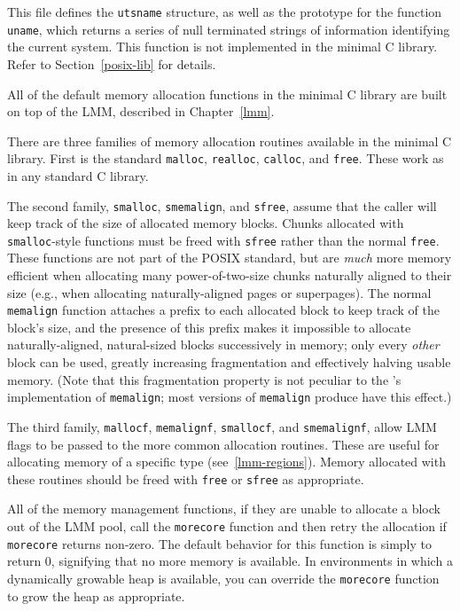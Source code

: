 \label{utsname-h}
\begin{apidesc}
	This file defines the {\tt utsname} structure, as well as the
	prototype for the \posix{} function {\tt uname}, which returns a
	series of null terminated strings of information identifying the
	current system. This function is not implemented in the minimal C
	library. Refer to Section~\ref{posix-lib} for details.
\end{apidesc}

\label{memalloc}

All of the default memory allocation functions in the minimal C library are
built on top of the \oskit{} LMM, described in Chapter~\ref{lmm}.

There are three families of memory allocation routines available in the
minimal C library.
First is the standard
{\tt malloc}, {\tt realloc}, {\tt calloc}, and {\tt free}.
These work as in any standard C library.  

The second family,
{\tt smalloc}, {\tt smemalign}, and {\tt sfree},
assume that the caller will keep track of the size of allocated memory blocks.
Chunks allocated with {\tt smalloc}-style functions must be freed
with {\tt sfree} rather than the normal {\tt free}.
These functions are not part of the POSIX standard,
but are \emph{much} more memory efficient
when allocating many power-of-two-size chunks naturally aligned to their size
(e.g., when allocating naturally-aligned pages or superpages).
The normal {\tt memalign} function attaches a prefix to each allocated block
to keep track of the block's size,
and the presence of this prefix makes it impossible
to allocate naturally-aligned, natural-sized blocks successively in memory;
only every \emph{other} block can be used,
greatly increasing fragmentation and effectively halving usable memory.
(Note that this fragmentation property is not peculiar
to the \oskit{}'s implementation of {\tt memalign};
most versions of {\tt memalign} produce have this effect.)

The third family,
{\tt mallocf}, {\tt memalignf}, {\tt smallocf}, and {\tt smemalignf},
allow LMM flags to be passed to the more common allocation routines.
These are useful for allocating memory of a specific type
(see~\ref{lmm-regions}).
Memory allocated with these routines should be freed with {\tt free}
or {\tt sfree} as appropriate.

All of the memory management functions,
if they are unable to allocate a block out
of the LMM pool, call the {\tt morecore} function
and then retry the allocation if {\tt morecore} returns non-zero.
The default behavior for this function is simply to return 0,
signifying that no more memory is available.
In environments in which a dynamically growable heap is available,
you can override the {\tt morecore} function to grow the heap as appropriate.


